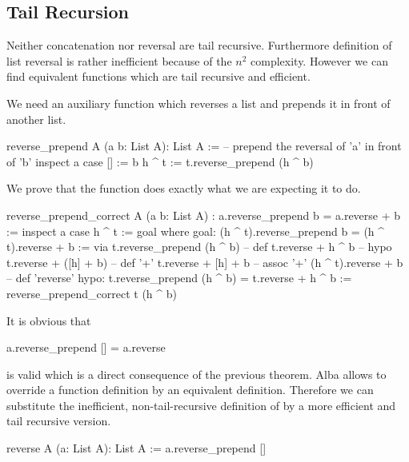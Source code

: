 \subsection{Tail Recursion}

Neither concatenation nor reversal are tail recursive. Furthermore definition
of list reversal is rather inefficient because of the $n^2$
complexity. However we can find equivalent functions which are tail recursive
and efficient.

We need an auxiliary function which reverses a list and prepends it in front
of another list.

\begin{alba}
  reverse_prepend A (a b: List A): List A :=
      -- prepend the reversal of 'a' in front of 'b'
    inspect
      a
    case
      [] :=
        b
      h ^ t :=
        t.reverse_prepend (h ^ b)
\end{alba}


We prove that the function does exactly what we are expecting it to do.

\begin{alba}
  reverse_prepend_correct
    A (a b: List A)
    : a.reverse_prepend b = a.reverse + b :=
      inspect a case
        h ^ t :=
          goal where
            goal: (h ^ t).reverse_prepend  b = (h ^ t).reverse + b :=
              via
                t.reverse_prepend (h ^ b)            -- def
                t.reverse + h ^ b                    -- hypo
                t.reverse + ([h] + b)                -- def '+'
                t.reverse + [h] + b                  -- assoc '+'
                (h ^ t).reverse + b                  -- def 'reverse'
             hypo: t.reverse_prepend (h ^ b) = t.reverse + h ^ b :=
               reverse_prepend_correct t (h ^ b)
\end{alba}


It is obvious that
%
\begin{alba}
  a.reverse_prepend [] = a.reverse
\end{alba}
%
is valid which is a direct consequence of the previous theorem. Alba allows to
override a function definition by an equivalent definition. Therefore we can
substitute the inefficient, non-tail-recursive definition of  by
a more efficient and tail recursive version.

\begin{alba}
  reverse A (a: List A): List A :=
    a.reverse_prepend []
\end{alba}


